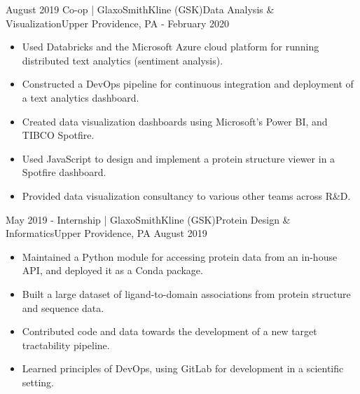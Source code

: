 \begin{experiences}
  \experience
    {August 2019} {Co-op | GlaxoSmithKline (GSK)}{Data Analysis \& Visualization}{Upper Providence, PA}
    {- February 2020} {
    \begin{itemize}
    \item Used Databricks and the Microsoft Azure cloud platform for running distributed text analytics (sentiment analysis).
    \item Constructed a DevOps pipeline for continuous integration and deployment of a text analytics dashboard.
    \item Created data visualization dashboards using Microsoft's Power BI, and TIBCO Spotfire.
    \item Used JavaScript to design and implement a protein structure viewer in a Spotfire dashboard.
    \item Provided data visualization consultancy to various other teams across R\&D.
    \end{itemize}
    }

  \emptySeparator

  \experience
    {May 2019 -} {Internship | GlaxoSmithKline (GSK)}{Protein Design \& Informatics}{Upper Providence, PA}
    {August 2019}    {
        \begin{itemize}
        \item Maintained a Python module for accessing protein data from an in-house API, and deployed it as a Conda package.
        \item Built a large dataset of ligand-to-domain associations from protein structure and sequence data.
        \item Contributed code and data towards the development of a new target tractability pipeline.
        \item Learned principles of DevOps, using GitLab for development in a scientific setting.
        \end{itemize}
    }

  \emptySeparator


\end{experiences}
